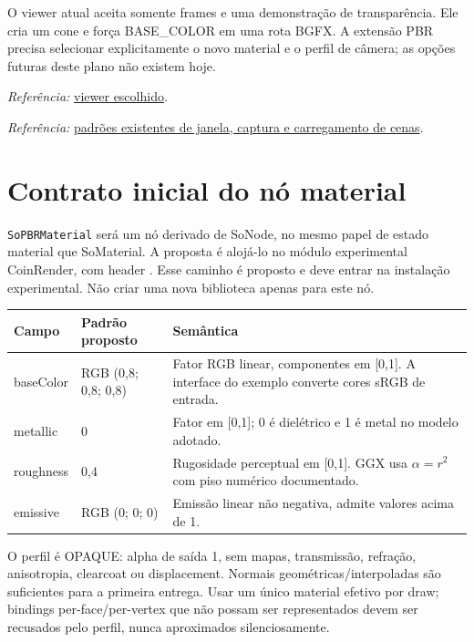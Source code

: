 \documentclass[11pt,a4paper]{article}
\newcommand{\src}[2]{\par{\small\textit{Referência:} \href{#1}{#2}.}\par}
\begin{document}
O viewer atual aceita somente frames e uma demonstração de transparência. Ele cria um cone e força BASE\_COLOR em uma rota BGFX. A extensão PBR precisa selecionar explicitamente o novo material e o perfil de câmera; as opções futuras deste plano não existem hoje.
\src{/mnt/Laranja/Git/externos/coin-render/examples/coinrender/coin_render_viewer.cpp}{viewer escolhido}
\src{/mnt/Laranja/Git/externos/coin-render/examples/coinrender/coin_render_window_benchmark.cpp}{padrões existentes de janela, captura e carregamento de cenas}

\section{Contrato inicial do nó material}

\texttt{SoPBRMaterial} será um nó derivado de SoNode, no mesmo papel de estado material que SoMaterial. A proposta é alojá-lo no módulo experimental CoinRender, com header . Esse caminho é proposto e deve entrar na instalação experimental. Não criar uma nova biblioteca apenas para este nó.

\begin{center}\small
\begin{tabular}{P{.20\linewidth}P{.18\linewidth}P{.52\linewidth}}
\toprule Campo & Padrão proposto & Semântica\\\midrule
baseColor & RGB (0,8; 0,8; 0,8) & Fator RGB linear, componentes em [0,1]. A interface do exemplo converte cores sRGB de entrada.\\
metallic & 0 & Fator em [0,1]; 0 é dielétrico e 1 é metal no modelo adotado.\\
roughness & 0,4 & Rugosidade perceptual em [0,1]. GGX usa $\alpha=r^2$ com piso numérico documentado.\\
emissive & RGB (0; 0; 0) & Emissão linear não negativa, admite valores acima de 1.\\\bottomrule
\end{tabular}\end{center}

O perfil é OPAQUE: alpha de saída 1, sem mapas, transmissão, refração, anisotropia, clearcoat ou displacement. Normais geométricas/interpoladas são suficientes para a primeira entrega. Usar um único material efetivo por draw; bindings per-face/per-vertex que não possam ser representados devem ser recusados pelo perfil, nunca aproximados silenciosamente.
\end{document}
